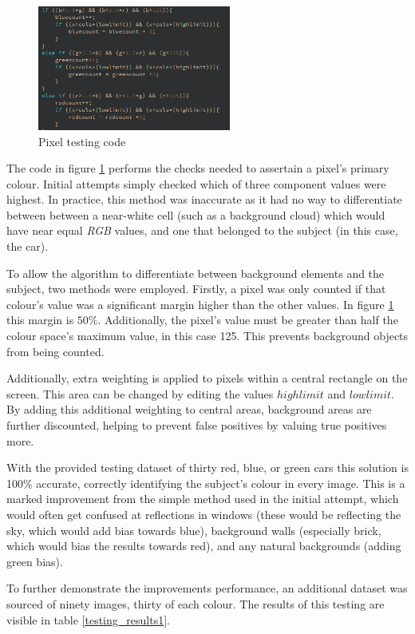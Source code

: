 \documentclass[conference]{IEEEtran}
\begin{document}
\begin{figure}[H]
\centering
\includegraphics[width=2.5in]{t1}
\caption{Pixel testing code}
\label{fig_t1code}
\end{figure}

The code in figure \ref{fig_t1code} performs the checks needed to assertain a pixel's primary colour. Initial attempts simply checked which of three component values were highest. In practice, this method was inaccurate as it had no way to differentiate between  between a near-white cell (such as a background cloud) which would have near equal \textit{RGB} values, and one that belonged to the subject (in this case, the car).

To allow the algorithm to differentiate between background elements and the subject, two methods were employed. Firstly, a pixel was only counted if that colour's value was a significant margin higher than the other values. In figure \ref{fig_t1code} this margin is $50\%$. Additionally, the pixel's value must be greater than half the colour space's maximum value, in this case 125. This prevents background objects from being counted.


Additionally, extra weighting is applied to pixels within a central rectangle on the screen. This area can be changed by editing the values $highlimit$ and $lowlimit$. By adding this additional weighting to central areas, background areas are further discounted, helping to prevent false positives by valuing true positives more.

With the provided testing dataset of thirty red, blue, or green cars this solution is 100$\%$ accurate, correctly identifying the subject's colour in every image. This is a marked improvement from the simple method used in the initial attempt, which would often get confused at reflections in windows (these would be reflecting the sky, which would add bias towards blue), background walls (especially brick, which would bias the results towards red), and any natural backgrounds (adding green bias).

To further demonstrate the improvements performance, an additional dataset was sourced of ninety images, thirty of each colour. The results of this testing are visible in table \ref{testing_results1}.
\end{document}
